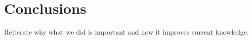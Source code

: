 \section{Conclusions\label{conclusions}}
Reiterate why what we did is important and how it improves current knowledge.
